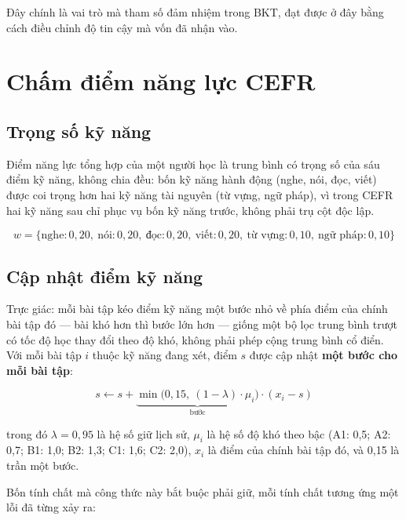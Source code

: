 Đây chính là vai trò mà tham số  đảm nhiệm trong BKT, đạt được ở đây bằng cách
điều chỉnh độ tin cậy mà  vốn đã nhận vào.

\section{Chấm điểm năng lực CEFR}

\subsection{Trọng số kỹ năng}

Điểm năng lực tổng hợp của một người học là trung bình có trọng số của sáu điểm kỹ năng,
không chia đều: bốn kỹ năng hành động (nghe, nói, đọc, viết) được coi trọng hơn hai kỹ
năng tài nguyên (từ vựng, ngữ pháp), vì trong CEFR hai kỹ năng sau chỉ phục vụ bốn kỹ
năng trước, không phải trụ cột độc lập.

\begin{equation}
w = \{\text{nghe}: 0{,}20,\ \text{nói}: 0{,}20,\ \text{đọc}: 0{,}20,\ \text{viết}: 0{,}20,\ \text{từ vựng}: 0{,}10,\ \text{ngữ pháp}: 0{,}10\}
\end{equation}

\subsection{Cập nhật điểm kỹ năng}

Trực giác: mỗi bài tập kéo điểm kỹ năng một bước nhỏ về phía điểm của chính bài tập đó —
bài khó hơn thì bước lớn hơn — giống một bộ lọc trung bình trượt có tốc độ học thay đổi
theo độ khó, không phải phép cộng trung bình cổ điển. Với mỗi bài tập \(i\) thuộc kỹ
năng đang xét, điểm \(s\) được cập nhật \textbf{một bước cho mỗi bài tập}:

\begin{equation}
s \leftarrow s + \underbrace{\min\big(0{,}15,\ (1-\lambda)\cdot\mu_i\big)}_{\text{bước}} \cdot (x_i - s)
\end{equation}

trong đó \(\lambda = 0{,}95\) là hệ số giữ lịch sử, \(\mu_i\) là hệ số độ khó theo bậc
(A1: 0,5; A2: 0,7; B1: 1,0; B2: 1,3; C1: 1,6; C2: 2,0), \(x_i\) là điểm của chính bài tập
đó, và 0,15 là trần một bước.

Bốn tính chất mà công thức này bắt buộc phải giữ, mỗi tính chất tương ứng một lỗi đã từng
xảy ra:

